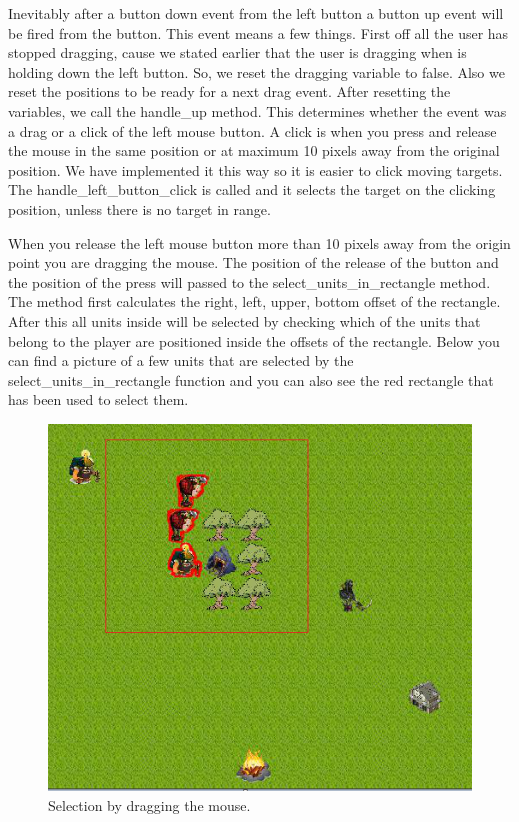 Inevitably after a button down event from the left button a button up event will be fired from the button. This event means a few things. First off all the user has stopped dragging, cause we stated earlier that the user is dragging when is holding down the left button. So, we reset the dragging variable to false. Also we reset the positions to be ready for a next drag event. After resetting the variables, we call the handle\_up method. This determines whether the event was a drag or a click of the left mouse button. A click is when you press and release the mouse in the same position or at maximum 10 pixels away from the original position. We have implemented it this way so it is easier to click moving targets. The handle\_left\_button\_click is called and it selects the target on the clicking position, unless there is no target in range.

When you release the left mouse button more than 10 pixels away from the origin point you are dragging the mouse. The position of the release of the button and the position of the press will passed to the select\_units\_in\_rectangle method. The method first calculates the right, left, upper, bottom offset of the rectangle. After this all units inside will be selected by checking which of the units that belong to the player are positioned inside the offsets of the rectangle. Below you can find a picture of a few units that are selected by the select\_units\_in\_rectangle function and you can also see the red rectangle that has been used to select them. 

\begin{figure}[!htb]
    \centering
    \includegraphics[scale=1.0]{images/SelectionRectangle.PNG}
    \caption{Selection by dragging the mouse.}\label{fig:fuzzy-distance}
\end{figure}
\newpage


